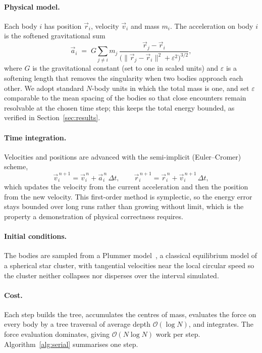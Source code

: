 \documentclass[11pt,a4paper]{article}
\begin{document}
\paragraph{Physical model.}
Each body $i$ has position $\vec r_i$, velocity $\vec v_i$ and mass $m_i$. The
acceleration on body $i$ is the softened gravitational sum
\begin{equation}
\label{eq:accel}
\vec a_i \;=\; G \sum_{j\neq i} m_j\,
  \frac{\vec r_j-\vec r_i}{\bigl(\lVert\vec r_j-\vec r_i\rVert^2+\varepsilon^2\bigr)^{3/2}},
\end{equation}
where $G$ is the gravitational constant (set to one in scaled units) and
$\varepsilon$ is a softening length that removes the singularity when two bodies
approach each other. We adopt standard $N$-body units in which the total mass is
one, and set $\varepsilon$ comparable to the mean spacing of the bodies so that
close encounters remain resolvable at the chosen time step; this keeps the total
energy bounded, as verified in Section~\ref{sec:results}.

\paragraph{Time integration.}
Velocities and positions are advanced with the semi-implicit (Euler--Cromer)
scheme,
\[
\vec v_i^{\,n+1}=\vec v_i^{\,n}+\vec a_i^{\,n}\,\Delta t,\qquad
\vec r_i^{\,n+1}=\vec r_i^{\,n}+\vec v_i^{\,n+1}\,\Delta t,
\]
which updates the velocity from the current acceleration and then the position
from the new velocity. This first-order method is symplectic, so the energy error
stays bounded over long runs rather than growing without limit, which is the
property a demonstration of physical correctness requires.

\paragraph{Initial conditions.}
The bodies are sampled from a Plummer model~\cite{plummer1911}, a classical
equilibrium model of a spherical star cluster, with tangential velocities near the
local circular speed so the cluster neither collapses nor disperses over the
interval simulated.

\paragraph{Cost.}
Each step builds the tree, accumulates the centres of mass, evaluates the force on
every body by a tree traversal of average depth $\mathcal{O}(\log N)$, and
integrates. The force evaluation dominates, giving $\mathcal{O}(N\log N)$ work per
step. Algorithm~\ref{alg:serial} summarises one step.
\end{document}
